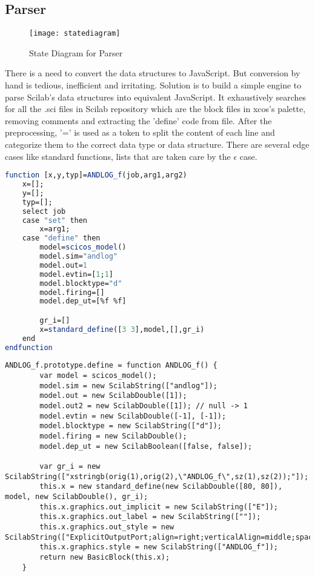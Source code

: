 \documentclass[conference]{IEEEtran}
\begin{document}
\subsection{Parser}
\begin{figure}
    \centering
    \texttt{[image: statediagram]}
    \caption{State Diagram for Parser}
    \label{fig:my_label}
\end{figure}
There is a need to convert the data structures to JavaScript. But conversion by hand is tedious, inefficient and irritating. Solution is to build a simple engine to parse Scilab's data structures into equivalent JavaScript. It exhaustively searches for all the .sci files in Scilab repository which are the block files in xcos's palette, removing comments and extracting the 'define' code from file. After the preprocessing, '=' is used as a token to split the content of each line and categorize them to the correct data type or data structure. There are several edge cases like standard functions, lists that are taken care by the $\epsilon$ case.

\begin{lstlisting}[language=Scilab, caption=ANDLOG.sci file]
function [x,y,typ]=ANDLOG_f(job,arg1,arg2)
    x=[];
    y=[];
    typ=[];
    select job
    case "set" then
        x=arg1;
    case "define" then
        model=scicos_model()
        model.sim="andlog"
        model.out=1
        model.evtin=[1;1]
        model.blocktype="d"
        model.firing=[]
        model.dep_ut=[%f %f]

        gr_i=[]
        x=standard_define([3 3],model,[],gr_i)
    end
endfunction

\end{lstlisting}

\begin{lstlisting}[language=VBScript, caption=ANDLOG.js file]
ANDLOG_f.prototype.define = function ANDLOG_f() {
        var model = scicos_model();
        model.sim = new ScilabString(["andlog"]);
        model.out = new ScilabDouble([1]);
        model.out2 = new ScilabDouble([1]); // null -> 1
        model.evtin = new ScilabDouble([-1], [-1]); 
        model.blocktype = new ScilabString(["d"]);
        model.firing = new ScilabDouble();
        model.dep_ut = new ScilabBoolean([false, false]);

        var gr_i = new ScilabString(["xstringb(orig(1),orig(2),\"ANDLOG_f\",sz(1),sz(2));"]);
        this.x = new standard_define(new ScilabDouble([80, 80]), model, new ScilabDouble(), gr_i); 
        this.x.graphics.out_implicit = new ScilabString(["E"]);
        this.x.graphics.out_label = new ScilabString([""]);
        this.x.graphics.out_style = new ScilabString(["ExplicitOutputPort;align=right;verticalAlign=middle;spacing=10.0;rotation=0"]);
        this.x.graphics.style = new ScilabString(["ANDLOG_f"]);
        return new BasicBlock(this.x);
    }

\end{lstlisting}
\end{document}
